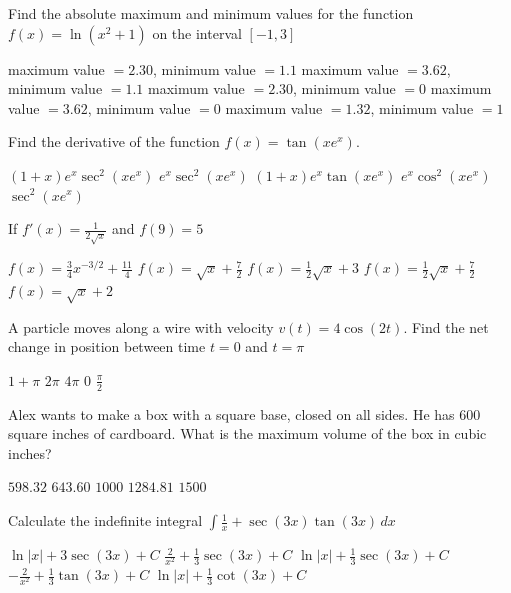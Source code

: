 \documentclass[11pt]{article}
\begin{document}
\begin{questions}
\begin{multiplechoice}{5}
\question Find the absolute maximum and minimum values for the function 
$f(x) = \ln(x^2 + 1)$ on the interval $[-1, 3]$
\begin{answers}{1}
\ans maximum value $= 2.30$, minimum value $ = 1.1$
\ans maximum value $= 3.62$, minimum value $ = 1.1$
\ans maximum value $= 2.30$, minimum value $ = 0$
\ans maximum value $= 3.62$, minimum value $ = 0$
\ans maximum value $= 1.32$, minimum value $ = 1$
\end{answers}

\newpage

\question Find the derivative of the function $f(x) = \tan(x e^x)$.
\begin{answers}{2}
\ans $(1+x)e^x \sec^2(xe^x) $
\ans $e^x \sec^2(xe^x) $
\ans $(1+x)e^x \tan(xe^x) $
\ans $e^x \cos^2(xe^x) $
\ans $\sec^2(xe^x) $
\end{answers}


\question If $f'(x) = \frac{1}{2\sqrt{x}}$ and $f(9) = 5$
\begin{answers}{2}
\ans $f(x) = \frac{3}{4}x^{-3/2} +  \frac{11}{4}$
\ans $f(x) = \sqrt{x} + \frac{7}{2}$
\ans $f(x) = \frac{1}{2}\sqrt{x} + 3$
\ans $f(x) = \frac{1}{2}\sqrt{x} + \frac{7}{2}$
\ans $f(x) = \sqrt{x} + 2$
\end{answers}


\question A particle moves along a wire with velocity $v(t) = 4\cos(2t)$.  Find the
net change in position between time $t = 0$ and $t = \pi$
\begin{answers}{2}
\ans $1  + \pi$
\ans $2\pi$
\ans $4\pi$
\ans $0$
\ans $\frac{\pi}{2}$
\end{answers}



\question Alex wants to make a box with a square base, closed on all sides.  He has 600 square inches of cardboard.  What is the maximum volume of the box in cubic inches?
\begin{answers}{3}
\ans $598.32$
\ans $643.60$
\ans $1000$
\ans $1284.81$
\ans $1500$
\end{answers}


\question Calculate the indefinite integral 
$\displaystyle \int \frac{1}{x} + \sec(3x) \tan(3x) \, dx$
\begin{answers}{2}
\ans $ \ln |x| + 3 \sec(3x) + C$
\ans $\frac{2}{x^2} + \frac{1}{3}\sec(3x) + C$
\ans $\ln|x|  + \frac{1}{3}\sec(3x) + C$
\ans $-\frac{2}{x^2}  + \frac{1}{3}\tan(3x) + C$
\ans $\ln |x| + \frac{1}{3}\cot(3x) + C$
\end{answers}



\end{multiplechoice}
\end{questions}
\end{document}
